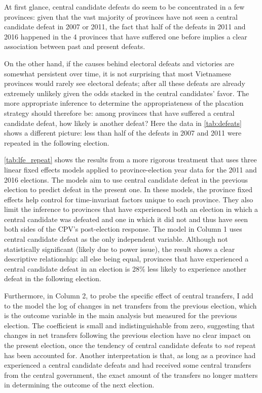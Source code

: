 \documentclass[12pt]{article}
\newcommand{\1}{\mathbbm{1}}
\begin{document}
At first glance, central candidate defeats do seem to be concentrated in a few provinces: given that the vast majority of provinces have not seen a central candidate defeat in 2007 or 2011, the fact that half of the defeats in 2011 and 2016 happened in the 4 provinces that have suffered one before implies a clear association between past and present defeats.

On the other hand, if the causes behind electoral defeats and victories are somewhat persistent over time, it is not surprising that most Vietnamese provinces would rarely see electoral defeats; after all these defeats are already extremely unlikely given the odds stacked in the central candidates' favor. The more appropriate inference to determine the appropriateness of the placation strategy should therefore be: among provinces that have suffered a central candidate defeat, how likely is another defeat? Here the data in \autoref{tab:defeats} shows a different picture: less than half of the defeats in 2007 and 2011 were repeated in the following election.

\autoref{tab:lfe_repeat} shows the results from a more rigorous treatment that uses three linear fixed effects models applied to province-election year data for the 2011 and 2016 elections. The models aim to use central candidate defeat in the previous election to predict defeat in the present one. In these models, the province fixed effects help control for time-invariant factors unique to each province. They also limit the inference to provinces that have experienced both an election in which a central candidate was defeated and one in which it did not and thus have seen both sides of the CPV's post-election response. The model in Column 1 uses central candidate defeat as the only independent variable. Although not statistically significant (likely due to power issue), the result shows a clear descriptive relationship: all else being equal, provinces that have experienced a central candidate defeat in an election is 28\% less likely to experience another defeat in the following election. 



Furthermore, in Column 2, to probe the specific effect of central transfers, I add to the model the log of changes in net transfers from the previous election, which is the outcome variable in the main analysis but measured for the previous election. The coefficient is small and indistinguishable from zero, suggesting that changes in net transfers following the previous election have no clear impact on the present election, once the tendency of central candidate defeats to \textit{not} repeat has been accounted for. Another interpretation is that, as long as a province had experienced a central candidate defeats and had received some central transfers from the central government, the exact amount of the transfers no longer matters in determining the outcome of the next election.
\end{document}
